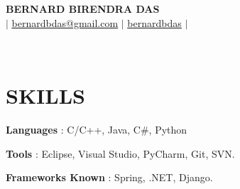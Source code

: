 \documentclass[letterpaper,10pt]{article}
\begin{document}
\begin{center}
    \textbf{\Large\scshape BERNARD BIRENDRA DAS} \\ \vspace{2pt}
    \small {} $|$ 
    \faEnvelope \hspace{2pt} \href{mailto:bernardbdas@gmail.com}{\color{black} \underline {bernardbdas@gmail.com}} $|$ 
    \faLinkedin \hspace{2pt}\href{www.linkedin.com/in/bernardbdas/} {\color{black} \underline{bernardbdas}} \hspace{1pt} $|$ 
    \address{  Kolkata, West Bengal}\\
\end{center}
\vspace{-15pt}

\section{SKILLS}
\begin{itemize}[leftmargin=0in, label={}]
\vspace{2pt}
    \small{
    \item {
        \textbf{Languages} {: C/C++, Java, C#, Python} \vspace{2pt} \\}
    \item {
        \textbf{Tools} {: Eclipse, Visual Studio, PyCharm, Git, SVN.}\vspace{2pt} \\}
    \item {
        \textbf{Frameworks Known} {: Spring, .NET, Django.}\vspace{2pt} \\}
    }
\end{itemize} 

\end{document}
